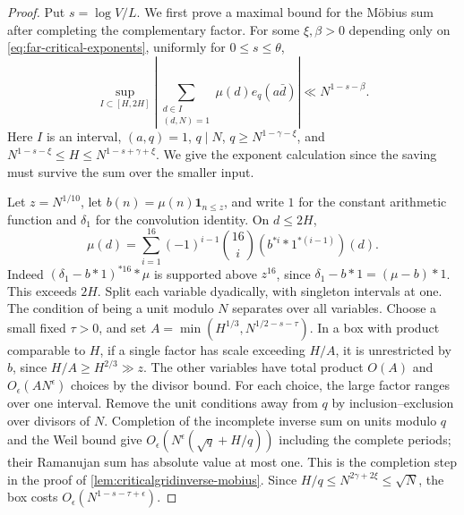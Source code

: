 \documentclass[11pt,a4paper]{article}
\numberwithin{equation}{section}
\begin{document}
\begin{proof}
Put $s=\log V/L$. We first prove a maximal bound for the
M\"obius sum after completing the complementary factor.
For some $\xi,\beta>0$ depending only on \eqref{eq:far-critical-exponents},
uniformly for $0\le s\le\theta$,
\begin{equation}
 \sup_{I\subset [H,2H]}
 \left|\sum_{\substack{d\in I\\(d,N)=1}}\mu(d)e_q(a\bar d)\right|
 \ll N^{1-s-\beta}.
 \label{eq:far-critical-inverse-max}
\end{equation}
Here $I$ is an interval, $(a,q)=1$, $q\mid N$,
$q\ge N^{1-\gamma-\xi}$, and
$N^{1-s-\xi}\le H\le N^{1-s+\gamma+\xi}$.
We give the exponent calculation since the saving must survive
the sum over the smaller input.

Let $z=N^{1/10}$, let $b(n)=\mu(n)\mathbf1_{n\le z}$,
and write $1$ for the constant arithmetic function and
$\delta_1$ for the convolution identity. On $d\le2H$,
\[
 \mu(d)=\sum_{i=1}^{16}(-1)^{i-1}\binom{16}{i}
                   (b^{*i}*1^{*(i-1)})(d).
\]
Indeed $(\delta_1-b*1)^{*16}*\mu$ is supported above $z^{16}$,
since $\delta_1-b*1=(\mu-b)*1$. This exceeds $2H$.
Split each variable dyadically, with singleton intervals at one.
The condition of being a unit modulo $N$ separates over all
variables. Choose a small fixed $\tau>0$, and set
$A=\min(H^{1/3},N^{1/2-s-\tau})$.
In a box with product comparable to $H$, if a single factor has
scale exceeding $H/A$, it is unrestricted by $b$, since
$H/A\ge H^{2/3}\gg z$. The other variables have total product
$O(A)$ and $O_\epsilon(AN^\epsilon)$ choices by the divisor
bound. For each choice, the large factor ranges over one
interval. Remove the unit conditions away from $q$ by
inclusion--exclusion over divisors of $N$. Completion of the
incomplete inverse sum on units modulo $q$ and the Weil bound
give $O_\epsilon(N^\epsilon(\sqrt q+H/q))$ including the
complete periods; their Ramanujan sum has absolute value at
most one. This is the completion step in the proof of
\cref{lem:criticalgridinverse-mobius}. Since
$H/q\le N^{2\gamma+2\xi}\le\sqrt N$, the box costs
$O_\epsilon(N^{1-s-\tau+\epsilon})$.


\end{proof}
\end{document}
